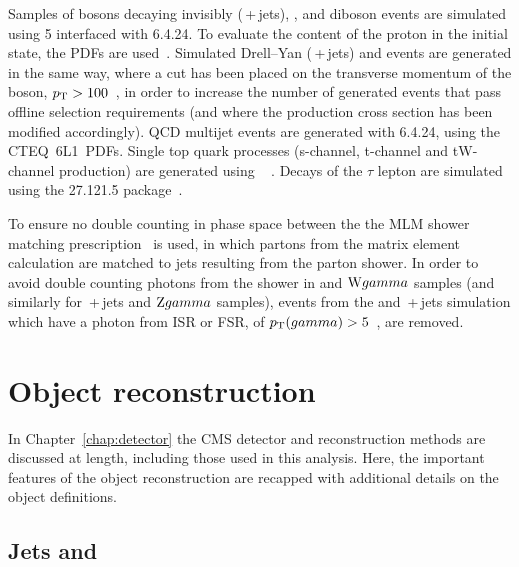 Samples of \Z bosons decaying invisibly (\znunubr{}\,+\,jets), \ttbar, and diboson events 
are simulated using \MADGRAPH{}5 interfaced with \PYTHIA{}6.4.24. 
To evaluate the content of the proton in the initial state, the  \ac{PDFs} are used~\cite{CTEQ6}. 
Simulated Drell--Yan (\zellellbr{}\,+\,jets) and \wpj{} events are generated in the same way, where a cut has been placed on the transverse momentum of the boson, $p_{\text{T}} > 100$~\GeV, in order to increase the number of generated events that pass offline selection requirements (and where the production cross section has been modified accordingly).
QCD multijet events are generated with \PYTHIA{}6.4.24, using the CTEQ~6L1~\ac{PDFs}. 
Single top quark processes (s-channel, t-channel and tW-channel production) are generated using \POWHEG~\cite{powheg_st,powheg_tw} .
Decays of the $\tau$ lepton are simulated using the \TAUOLA{} 27.121.5 package~\cite{TAUOLA}. 

To ensure no double counting in phase space between the 
the MLM shower matching prescription~\cite{bib:GEN_MLM} is used, in which partons from the matrix element calculation are matched to jets resulting from the parton shower.
In order to avoid double counting photons from the \PYTHIA shower in \wpj{} and $\mathrm{W}gamma${} samples (and similarly for \zellellbr{}\,+\,jets and $\mathrm{Z}gamma${} samples), 
events from the \wpj{} and \zellellbr{}\,+\,jets simulation which have a photon from \ac{ISR} or \ac{FSR}, of $p_{\text{T}}(gamma)>5$~\GeV, are removed.


\section{Object reconstruction}
\label{sec:objectReco}

In Chapter~\ref{chap:detector} the CMS detector and reconstruction methods are discussed at length, including those used in this analysis. 
Here, the important features of the object reconstruction are recapped with additional details on the object definitions.

\subsection{Jets and \MET}

